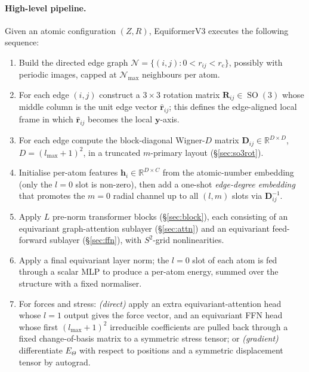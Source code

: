 \documentclass[11pt,a4paper]{article}
\DeclareMathOperator{\SO}{SO}
\newcommand{\R}{\mathbb{R}}
\newcommand{\Sph}{S^2}
\newcommand{\bR}{\bm{R}}
\newcommand{\brh}{\hat{\bm{r}}}
\newcommand{\by}{\bm{y}}
\newcommand{\bh}{\bm{h}}
\newcommand{\bD}{\bm{D}}
\newcommand{\rcut}{r_{\mathrm{c}}}
\newcommand{\lmax}{l_{\max}}
\newcommand{\Nb}{\mathcal{N}}
\theoremstyle{plain}
\theoremstyle{definition}
\theoremstyle{remark}
\begin{document}
\paragraph{High-level pipeline.}
Given an atomic configuration $(Z,R)$, EquiformerV3 executes the following
sequence:
\begin{enumerate}[leftmargin=2em]
    \item Build the directed edge graph $\Nb=\{(i,j):0<r_{ij}<\rcut\}$, possibly with
          periodic images, capped at $\Nb_{\max}$ neighbours per atom.
    \item For each edge $(i,j)$ construct a $3\times 3$ rotation matrix
          $\bR_{ij}\in\SO(3)$ whose middle column is the unit edge vector $\brh_{ij}$;
          this defines the edge-aligned local frame in which $\brh_{ij}$ becomes the
          local $\by$-axis.
    \item For each edge compute the block-diagonal Wigner-$D$ matrix
          $\bD_{ij}\in\R^{D\times D}$, $D=(\lmax+1)^2$, in a truncated $m$-primary layout
          (\S\ref{sec:so3rot}).
    \item Initialise per-atom features $\bh_i\in\R^{D\times C}$ from the atomic-number
          embedding (only the $l=0$ slot is non-zero), then add a one-shot
          \emph{edge-degree embedding} that promotes the $m=0$ radial channel up to all
          $(l,m)$ slots via $\bD_{ij}^{-1}$.
    \item Apply $L$ pre-norm transformer blocks (\S\ref{sec:block}), each consisting of
          an equivariant graph-attention sublayer (\S\ref{sec:attn}) and an equivariant
          feed-forward sublayer (\S\ref{sec:ffn}), with $\Sph$-grid nonlinearities.
    \item Apply a final equivariant layer norm; the $l=0$ slot of each atom is fed
          through a scalar MLP to produce a per-atom energy, summed over the structure
          with a fixed normaliser.
    \item For forces and stress: \emph{(direct)} apply an extra equivariant-attention
          head whose $l=1$ output gives the force vector, and an equivariant FFN head
          whose first $(\lmax+1)^2$ irreducible coefficients are pulled back through a
          fixed change-of-basis matrix to a symmetric stress tensor; or \emph{(gradient)}
          differentiate $E_\Theta$ with respect to positions and a symmetric displacement
          tensor by autograd.
\end{enumerate}
\end{document}
